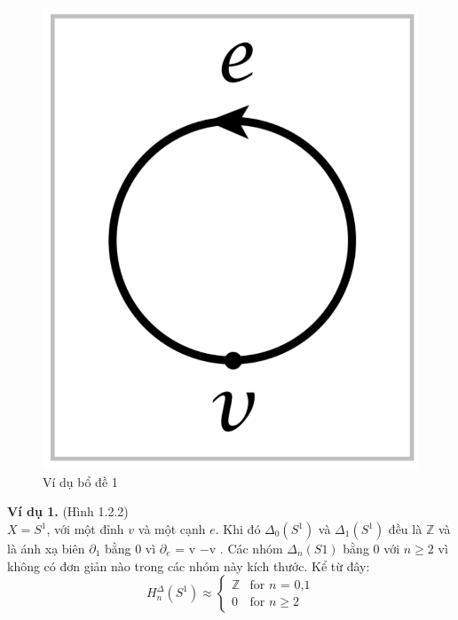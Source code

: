 \begin{figure}[h]
	\centering
	\includegraphics[scale=0.2]{figures/chap1_3}
	\caption[Ví dụ bổ đề 1]{Ví dụ bổ đề 1
	\label{fig:chap1_3}}
\end{figure}

\textbf{Ví dụ 1.} (Hình 1.2.2) \\
\indent \(X = S^1\), với một đỉnh \(v\) và một cạnh \(e\). Khi đó \(\Delta_0 (S^1)\) và \(\Delta_1 (S^1)\) đều là $\mathds{Z}$ và là ánh xạ biên \(\partial_1\) bằng 0 vì \(\partial_e\) = v −v . Các nhóm \(\Delta_n(S1)\) bằng 0 với \(n \geq 2\) vì không có đơn giản nào trong các nhóm này kích thước. Kể từ đây: \[H_n^{\Delta}(S^1) \approx \begin{cases}
\mathds{Z} & \text{for $n$ = 0,1}\\
0 & \text{for $n$} \geq 2
\end{cases} 
\] 

